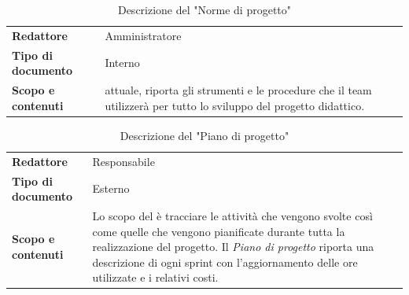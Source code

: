 \documentclass[a4paper,12pt]{article}
\begin{document}
{{{            {\renewcommand{\arraystretch}{1.4}
            \begin{table}[h]
            \centering
            \begin{tabularx}{\textwidth}{|l|X|}
                \hline
                \rowcolor{gold}
                \multicolumn{2}{|c|}{\textbf{Norme di progetto}}\\
                \hline
                \textbf{Redattore} & Amministratore\\
                \hline
                \textbf{Tipo di documento} & Interno\\
                \hline
                \textbf{Scopo e contenuti} & attuale, riporta gli strumenti e le procedure che il team utilizzerà per tutto lo sviluppo del progetto didattico. \\
                \hline
            \end{tabularx}      
            \caption{Descrizione del "Norme di progetto"}
            \end{table}
            }

            {\renewcommand{\arraystretch}{1.4}
            \begin{table}[H]
            \centering
                \begin{tabularx}{\textwidth}{|l|X|}
                    \hline
                    \rowcolor{gold}
                    \multicolumn{2}{|c|}{\textbf{Piano di progetto}}\\
                    \hline
                    \textbf{Redattore} & Responsabile\\
                    \hline
                    \textbf{Tipo di documento} & Esterno\\
                    \hline
                    \textbf{Scopo e contenuti} & Lo scopo del è tracciare le attività che vengono svolte così come quelle che vengono pianificate durante tutta la realizzazione del progetto. Il \textit{Piano di progetto} riporta una descrizione di ogni sprint con l'aggiornamento delle ore utilizzate e i relativi costi.\\
                    \hline
                \end{tabularx}     
            \caption{Descrizione del "Piano di progetto"}
            \end{table}
            }

}}}
\end{document}
